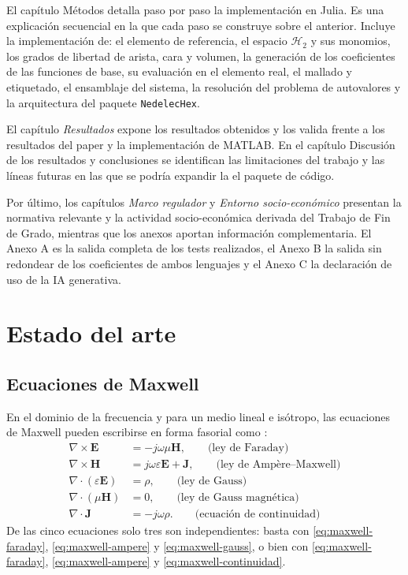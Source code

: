 \documentclass[12pt]{report} %
\begin{document}
El capítulo Métodos detalla paso por paso la implementación en Julia. Es una explicación secuencial en la que cada paso se construye sobre el anterior. Incluye la implementación de: el elemento de referencia, el espacio $\mathcal{H}_2$ y sus monomios, los grados de libertad de arista, cara y volumen, la generación de los coeficientes de las funciones de base, su evaluación en el elemento real, el mallado y etiquetado, el ensamblaje del sistema, la resolución del problema de autovalores y la arquitectura del paquete \texttt{NedelecHex}.

El capítulo \emph{Resultados} expone los resultados obtenidos y los valida frente a los resultados del paper y la implementación de MATLAB. En el capítulo Discusión de los resultados y conclusiones se identifican las limitaciones del trabajo y las líneas futuras en las que se podría expandir la el paquete de código.

Por último, los capítulos \emph{Marco regulador} y \emph{Entorno socio-económico} presentan la normativa relevante y la actividad socio-económica derivada del Trabajo de Fin de Grado, mientras que los anexos aportan información complementaria. El Anexo A es la salida completa de los tests realizados, el Anexo B la salida sin redondear de los coeficientes de ambos lenguajes y el Anexo C la declaración de uso de la IA generativa.
\chapter{Estado del arte}\label{cap:estado-arte}

\section {Ecuaciones de Maxwell}\label{subsec:maxwell-t}
En el dominio de la frecuencia y para un medio lineal e isótropo, las
ecuaciones de Maxwell pueden escribirse en forma fasorial como
\cite{jin2015, jacobsson2007nedelec}:
\begin{align}
	\nabla \times \mathbf{E} &= -j\omega\mu\mathbf{H}, \qquad \text{(ley de Faraday)} \label{eq:maxwell-faraday}\\
	\nabla \times \mathbf{H} &= j\omega\varepsilon\mathbf{E} + \mathbf{J}, \qquad \text{(ley de Amp\`ere--Maxwell)} \label{eq:maxwell-ampere}\\
	\nabla \cdot (\varepsilon\mathbf{E}) &= \rho, \qquad \text{(ley de Gauss)} \label{eq:maxwell-gauss}\\
	\nabla \cdot (\mu\mathbf{H}) &= 0, \qquad \text{(ley de Gauss magn\'etica)} \label{eq:maxwell-gauss-mag}\\
	\nabla \cdot \mathbf{J} &= -j\omega\rho. \qquad \text{(ecuaci\'on de continuidad)} \label{eq:maxwell-continuidad}
\end{align}
De las cinco ecuaciones solo tres son independientes: basta con
\eqref{eq:maxwell-faraday}, \eqref{eq:maxwell-ampere} y \eqref{eq:maxwell-gauss},
o bien con \eqref{eq:maxwell-faraday}, \eqref{eq:maxwell-ampere} y
\eqref{eq:maxwell-continuidad}. 
\end{document}
